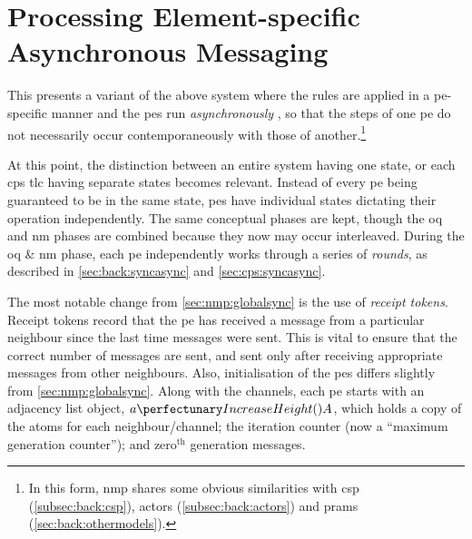 \section{\label{sec:nmp:pespecific}Processing Element-specific Asynchronous Messaging}

This  presents a variant of the above system where the rules are applied in a \gls{pe}-specific manner and the \glspl{pe} run \emph{asynchronously} \cite{Balanescu2011,Nicolescu2014}, so that the steps of one \gls{pe} do not necessarily occur contemporaneously with those of another.\footnote{In this form, \gls{nmp} shares some obvious similarities with \Gls{csp} (\cref{subsec:back:csp}), \Glspl{actor} (\cref{subsec:back:actors}) and \Glspl{pram} (\cref{sec:back:othermodels}).}  

At this point, the distinction between an entire system having one state, or each \gls{cps} \gls{tlc} having separate states becomes relevant.  Instead of every \gls{pe} being guaranteed to be in the same state, \glspl{pe} have individual states dictating their operation independently.  The same conceptual phases are kept, though the \gls{oq} and \gls{nm} phases are combined because they now may occur interleaved.  During the \gls{oq} \& \gls{nm} phase, each \gls{pe} independently works through a series of \label{pg:nmp:rounds}\emph{rounds}, as described in \vref{sec:back:syncasync} and \vref{sec:cps:syncasync}. %

The most notable change from \cref{sec:nmp:globalsync} is the use of \emph{receipt tokens}.  Receipt tokens record that the \gls{pe} has received a message from a particular neighbour since the last time messages were sent.  This is vital to ensure that the correct number of messages are sent, and sent only after receiving appropriate messages from other neighbours.  Also, initialisation of the \glspl{pe} differs slightly from \cref{sec:nmp:globalsync}.  Along with the channels, each \gls{pe} starts with an adjacency list object, \(\cpfunc{a}{A}\), which holds a copy of the atoms for each neighbour/channel; the iteration counter (now a ``maximum generation counter''); and \(\text{zero}^{\text{th}}\) generation messages.

